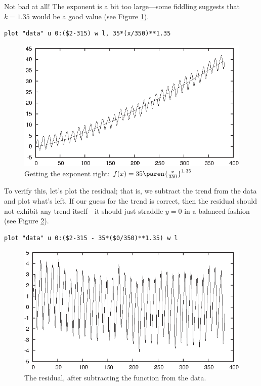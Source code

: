 Not bad at all! The exponent is a bit too large---some fiddling
suggests that $k=1.35$ would be a good value (see Figure
\ref{fig:session04}).

\begin{verbatim}
plot "data" u 0:($2-315) w l, 35*(x/350)**1.35
\end{verbatim}

\begin{figure}[t!]
  \centerline{\includegraphics{img/session04}}
  \caption{Getting the exponent right: 
    $f(x) = 35 \paren{\frac{x}{350}}^{1.35}$}
  \label{fig:session04}
\end{figure}
    
To verify this, let's plot the residual; that is, we subtract the
trend from the data and plot what's left. If our guess for the trend
is correct, then the residual should not exhibit any trend itself---it
should just straddle $y=0$ in a balanced fashion (see Figure
\ref{fig:session05}).

\begin{verbatim}
plot "data" u 0:($2-315 - 35*($0/350)**1.35) w l
\end{verbatim}

\begin{figure}[t!]
  \centerline{\includegraphics{img/session05}}
  \caption{The residual, after subtracting the function from the data.}
  \label{fig:session05}
\end{figure}
    
